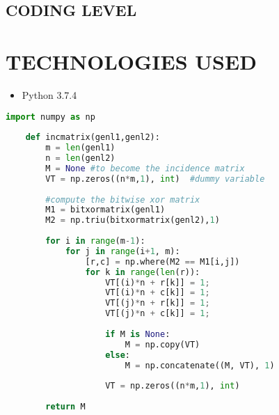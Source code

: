 \documentclass{article}
\begin{document}
  \subsection*{CODING LEVEL}
  \begin{center}
  \end{center}
  \clearpage
  \section*{\textbf{TECHNOLOGIES USED}}
  \begin{itemize}
    \item Python 3.7.4
  \end{itemize}
  \begin{lstlisting}[language=Python, caption=Python example]
    import numpy as np
        
    def incmatrix(genl1,genl2):
        m = len(genl1)
        n = len(genl2)
        M = None #to become the incidence matrix
        VT = np.zeros((n*m,1), int)  #dummy variable
        
        #compute the bitwise xor matrix
        M1 = bitxormatrix(genl1)
        M2 = np.triu(bitxormatrix(genl2),1) 
    
        for i in range(m-1):
            for j in range(i+1, m):
                [r,c] = np.where(M2 == M1[i,j])
                for k in range(len(r)):
                    VT[(i)*n + r[k]] = 1;
                    VT[(i)*n + c[k]] = 1;
                    VT[(j)*n + r[k]] = 1;
                    VT[(j)*n + c[k]] = 1;
                    
                    if M is None:
                        M = np.copy(VT)
                    else:
                        M = np.concatenate((M, VT), 1)
                    
                    VT = np.zeros((n*m,1), int)
        
        return M
    \end{lstlisting}
\end{document}
